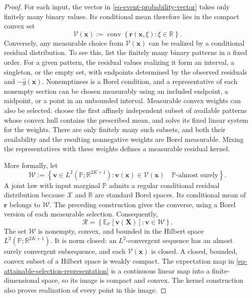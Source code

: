 \documentclass[review,11pt,3p,authoryear,nopreprintline]{elsarticle}
\begin{document}
\begin{proof}
  For each input, the vector in \eqref{eq-event-probability-vector} takes only finitely many binary values. Its conditional mean therefore lies in the compact convex set
  \[
    \mathcal V(\bm x):=\operatorname{conv}\left\{\bm r(\bm x,\xi):\xi\in\mathbb R\right\}.
  \]
  Conversely, any measurable choice from $\mathcal V(\bm x)$ can be realized by a conditional residual distribution. To see this, list the finitely many binary patterns in a fixed order. For a given pattern, the residual values realizing it form an interval, a singleton, or the empty set, with endpoints determined by the observed residuals and $-\hat g(\bm x)$. Nonemptiness is a Borel condition, and a representative of each nonempty section can be chosen measurably using an included endpoint, a midpoint, or a point in an unbounded interval. Measurable convex weights can also be selected: choose the first affinely independent subset of available patterns whose convex hull contains the prescribed mean, and solve its fixed linear system for the weights. There are only finitely many such subsets, and both their availability and the resulting nonnegative weights are Borel measurable. Mixing the representatives with these weights defines a measurable residual kernel.

  More formally, let
  \[
    \mathcal W:=\left\{
      \bm v\in L^2\left(\mathbb P;\mathbb R^{2K+1}\right):
      \bm v(\bm x)\in\mathcal V(\bm x)\quad\mathbb P\text{-almost surely}
    \right\}.
  \]
  A joint law with input marginal $\mathbb P$ admits a regular conditional residual distribution because $\mathcal X$ and $\mathbb R$ are standard Borel spaces. Its conditional mean of $\bm r$ belongs to $\mathcal W$. The preceding construction gives the converse, using a Borel version of each measurable selection. Consequently,
  \begin{equation}
    \mathcal R=\left\{\mathbb E_{\mathbb P}\left[\bm v(\bm X)\right]:\bm v\in\mathcal W\right\}.
    \label{eq-attainable-selection-representation}
  \end{equation}
  The set $\mathcal W$ is nonempty, convex, and bounded in the Hilbert space $L^2\left(\mathbb P;\mathbb R^{2K+1}\right)$. It is norm closed: an $L^2$-convergent sequence has an almost surely convergent subsequence, and each $\mathcal V(\bm x)$ is closed. A closed, bounded, convex subset of a Hilbert space is weakly compact. The expectation map in \eqref{eq-attainable-selection-representation} is a continuous linear map into a finite-dimensional space, so its image is compact and convex. The kernel construction also proves realization of every point in this image.
\end{proof}
\end{document}
